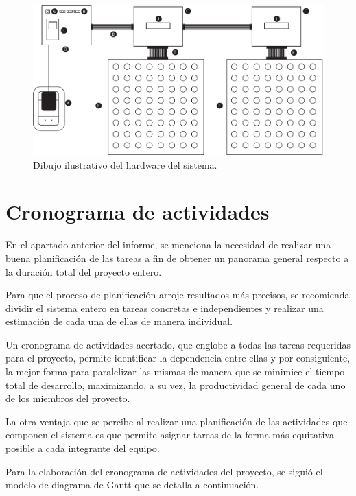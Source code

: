 	\begin{figure}[ht!]
		\begin{center}
			\centering
			\includegraphics[width=1\linewidth]{imagenes/dibujo-fisico.pdf}
			\caption{Dibujo ilustrativo del hardware del sistema.}
			\label{fig:dibujo-real}
		\end{center}
	\end{figure}

	
\section{Cronograma de actividades}

En el apartado anterior del informe, se menciona la necesidad de realizar una buena planificación de las tareas a fin de obtener un panorama general respecto a la duración total del proyecto entero.

Para que el proceso de planificación arroje resultados más precisos, se recomienda dividir el sistema entero en tareas concretas e independientes y realizar una estimación de cada una de ellas de manera individual.

Un cronograma de actividades acertado, que englobe a todas las tareas requeridas para el proyecto, permite identificar la dependencia entre ellas y por consiguiente, la mejor forma para paralelizar las mismas de manera que se minimice el tiempo total de desarrollo, maximizando, a su vez, la productividad general de cada uno de los miembros del proyecto.

La otra ventaja que se percibe al realizar una planificación de las actividades que componen el sistema es que permite asignar tareas de la forma más equitativa posible a cada integrante del equipo.

Para la elaboración del cronograma de actividades del proyecto, se siguió el modelo de diagrama de Gantt que se detalla a continuación.

